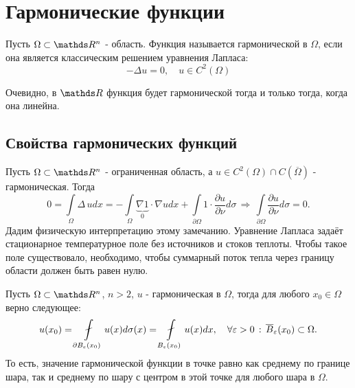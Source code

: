 
\section{Гармонические функции}
\begin{definition} Пусть $\Omega \subset \real^n$ - область. Функция называется гармонической в $\Omega$, если она является классическим решением уравнения Лапласа:
$$-\Delta u = 0, \quad u \in C^2(\Omega)$$
\end{definition}
\begin{note}
Очевидно, в $\real$ функция будет гармонической тогда и только тогда, когда она линейна.
\end{note}

\subsection{Свойства гармонических функций}
\begin{note}
Пусть $\Omega \subset \real^n$ - ограниченная область, а $u \in C^2(\Omega)\cap C(\overline{\Omega})$ - гармоническая. Тогда 
$$0 = \int \limits_\Omega \Delta \, u dx = -\int \limits_\Omega \underbrace {\nabla 1}_{0} \cdot \nabla u dx + \int \limits_{\partial\Omega} 1 \cdot \dfrac{\partial u}{\partial \nu}d\sigma\,\Rightarrow\, \int\limits_{\partial\Omega}\dfrac{\partial u}{\partial \nu}d\sigma = 0.$$
Дадим физическую интерпретацию этому замечанию. Уравнение Лапласа задаёт стационарное температурное поле без источников и стоков теплоты. Чтобы такое поле существовало, необходимо, чтобы суммарный поток тепла через границу области должен быть равен нулю.
\end{note}

\begin{theorem}
Пусть $\Omega \subset \real^n$, $n > 2$, $u$ - гармоническая в $\Omega$, тогда для любого $x_0 \in \Omega$ верно следующее:
$$u(x_0) = \fint \limits_{\partial B_\eps(x_0)} u(x) d\sigma(x) = \fint \limits_{B_\eps(x_0)} u(x)dx, \quad \forall \eps > 0 \,:\, \overline{B}_\eps(x_0)\subset\Omega.$$
То есть, значение гармонической функции в точке равно как среднему по границе шара, так и среднему по шару с центром в этой точке для любого шара в $\Omega$.
\end{theorem}

